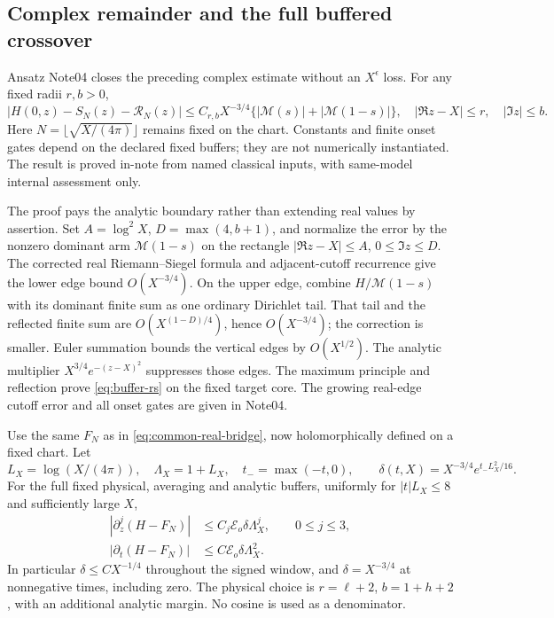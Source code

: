 \documentclass[11pt]{article}
\newcommand{\Mc}{\mathcal M}
\numberwithin{equation}{section}
\begin{document}
\subsection{Complex remainder and the full buffered crossover}
Ansatz Note04 \cite{ansatz04} closes the preceding complex estimate
without an \(X^\epsilon\) loss. For any fixed radii \(r,b>0\),
\begin{equation}
 |H(0,z)-S_N(z)-\mathcal R_N(z)|
 \le C_{r,b}X^{-3/4}\{ |\Mc(s)|+|\Mc(1-s)|\},
 \quad |\Re z-X|\le r,\quad |\Im z|\le b.
 \label{eq:buffer-rs}
\end{equation}
Here \(N=\lfloor\sqrt{X/(4\pi)}\rfloor\) remains fixed on the chart.
Constants and finite onset gates depend on the declared fixed buffers;
they are not numerically instantiated. The result is proved in-note
from named classical inputs, with same-model internal assessment only.

The proof pays the analytic boundary rather than extending real values
by assertion. Set \(A=\log^2X\), \(D=\max(4,b+1)\), and normalize
the error by the nonzero dominant arm \(\Mc(1-s)\) on the rectangle
\( |\Re z-X|\le A\), \(0\le\Im z\le D\). The corrected real
Riemann--Siegel formula and adjacent-cutoff recurrence give the lower
edge bound \(O(X^{-3/4})\). On the upper edge, combine
\(H/\Mc(1-s)\) with its dominant finite sum as one ordinary Dirichlet
tail. That tail and the reflected finite sum are
\(O(X^{(1-D)/4})\), hence \(O(X^{-3/4})\); the correction is smaller.
Euler summation bounds the vertical edges by \(O(X^{1/2})\).
The analytic multiplier \(X^{3/4}e^{-(z-X)^2}\) suppresses those
edges. The maximum principle and reflection prove
\eqref{eq:buffer-rs} on the fixed target core. The growing real-edge
cutoff error and all onset gates are given in Note04.

Use the same \(F_N\) as in \eqref{eq:common-real-bridge}, now
holomorphically defined on a fixed chart. Let
\[
 L_X=\log(X/(4\pi)),\quad \Lambda_X=1+L_X,\quad
 t_-=\max(-t,0),\qquad
 \delta(t,X)=X^{-3/4}e^{t_-L_X^2/16}.
\]
For the full fixed physical, averaging and analytic buffers, uniformly
for \(|t|L_X\le8\) and sufficiently large \(X\),
\begin{align}
 |\partial_z^j(H-F_N)|&\le C_j\mathcal E_o\delta\Lambda_X^j,
                       \qquad 0\le j\le3,
                       \label{eq:buffered-crossover-jets}\\
 |\partial_t(H-F_N)|&\le C\mathcal E_o\delta\Lambda_X^2.
                       \label{eq:buffered-crossover-time}
\end{align}
In particular \(\delta\le C X^{-1/4}\) throughout the signed window,
and \(\delta=X^{-3/4}\) at nonnegative times, including zero.
The physical choice is \(r=\ell+2\), \(b=1+h+2\), with an
additional analytic margin. No cosine is used as a denominator.
\end{document}
